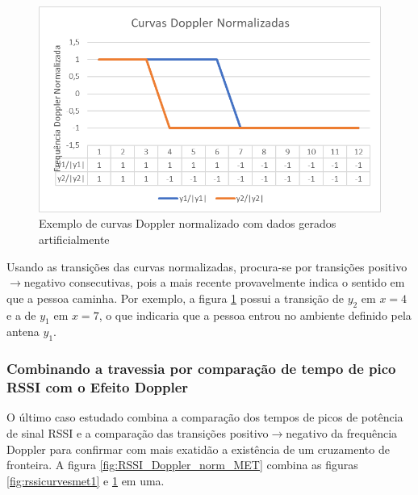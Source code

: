   \begin{figure}[H]
    \centering
    \includegraphics[width=0.8\linewidth]{figs/Metodologia/image007.png}
    \caption{Exemplo de curvas Doppler normalizado com dados gerados artificialmente}
    \label{fig:Doppler_norm_MET}
\end{figure}

Usando as transições das curvas normalizadas, procura-se por transições positivo$\rightarrow$negativo consecutivas, pois a mais recente provavelmente indica o sentido em que a pessoa caminha. Por exemplo, a figura \ref{fig:Doppler_norm_MET} possui a transição de $y_2$ em $x=4$ e a de $y_1$ em $x=7$, o que indicaria que a pessoa entrou no ambiente definido pela antena $y_1$.
 
 \subsubsection{Combinando a travessia por comparação de tempo de pico RSSI com o Efeito Doppler} \label{section:RSSI+doppler_met}
 
O último caso estudado combina a comparação dos tempos de picos de potência de sinal RSSI e a comparação das transições positivo$\rightarrow$negativo da frequência Doppler para confirmar com mais exatidão a existência de um cruzamento de fronteira. A figura \ref{fig:RSSI_Doppler_norm_MET} combina as figuras \ref{fig:rssicurvesmet1} e \ref{fig:Doppler_norm_MET} em uma.


